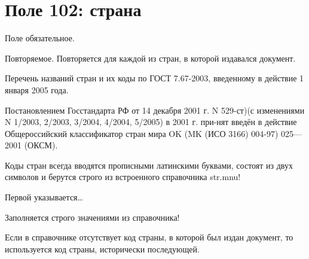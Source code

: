 \chapter{Поле 102: страна}

Поле обязательное.

Повторяемое. Повторяется для каждой из стран, в которой издавался документ.

Перечень названий стран и их коды по ГОСТ 7.67-2003, введенному в действие 1 января 2005 года.

Постановлением Госстандарта РФ от 14 декабря 2001 г. N 529-ст)(с изменениями N 1/2003, 2/2003, 3/2004, 4/2004, 5/2005) в 2001 г. при-нят введён в действие Общероссийский классификатор стран мира OK (MK (ИСО 3166) 004-97) 025—2001 (ОКСМ).

Коды стран всегда вводятся прописными латинскими буквами, состоят из двух символов и берутся строго из встроенного справочника str.mnu!

Первой указывается… %

Заполняется строго значениями из справочника!

Если в справочнике отсутствует код страны, в которой был издан документ, то используется код страны, исторически последующей.
